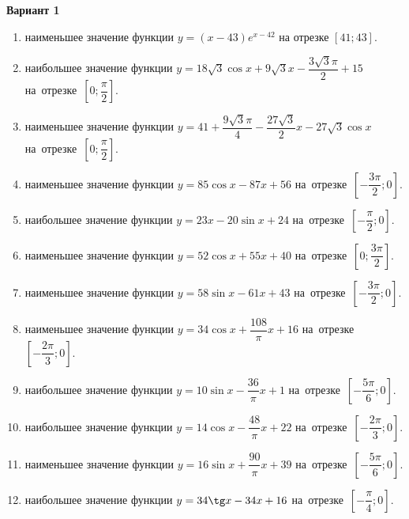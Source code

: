 \documentclass[a4paper,10pt]{article}
\begin{document}
\begin{center}\Large\textbf{Вариант 1}\end{center}

\begin{enumerate}
\item {} наименьшее значение функции $y = \left(x-43\right)e^{x-42}$ на отрезке $\left[41;43\right]$.

\item {} наибольшее значение функции $y = 18\sqrt{3}\cos x+9\sqrt{3}x-\dfrac{3\sqrt{3}\pi}{2} +15$ на~отрезке~$\left[0;\dfrac{\pi }{2}\right]$.

\item {} наименьшее значение функции $y = 41+\dfrac{9\sqrt{3} \pi}{4}-\dfrac{27\sqrt{3}}{2}x-27\sqrt{3}\cos x$ на~отрезке~$\left[0;\dfrac{\pi }{2}\right]$.

\item {} наименьшее значение функции $y = 85\cos x-87x+56$ на~отрезке~$\left[-\dfrac{3\pi }{2};0\right]$.

\item {} наибольшее значение функции $y = 23x-20\sin x+24$ на~отрезке~$\left[-\dfrac{\pi }{2};0\right]$.

\item {} наименьшее значение функции $y = 52\cos x+55x+40$ на~отрезке~$\left[0;\dfrac{3\pi }{2}\right]$.

\item {} наименьшее значение функции $y = 58\sin x-61x+43$ на~отрезке~$\left[-\dfrac{3\pi }{2};0\right]$.

\item {} наименьшее значение функции $y = 34\cos x+\dfrac{108}{\pi }x +16$ на~отрезке~$\left[-\dfrac{2\pi }{3};0\right]$.

\item {} наибольшее значение функции $y = 10\sin x-\dfrac{36}{\pi }x+1$ на~отрезке~$\left[-\dfrac{5\pi }{6};0\right]$.

\item {} наибольшее значение функции $y = 14\cos x-\dfrac{48}{\pi }x+22$ на~отрезке~$\left[-\dfrac{2\pi }{3};0\right]$.

\item {} наименьшее значение функции $y = 16\sin x+\dfrac{90}{\pi }x+39$ на~отрезке~$\left[-\dfrac{5\pi }{6};0\right]$.

\item {} наибольшее значение функции $y = 34\tg x-34x+16$ на~отрезке~$\left[-\dfrac{\pi }{4};0\right]$.


\end{enumerate}
\end{document}

